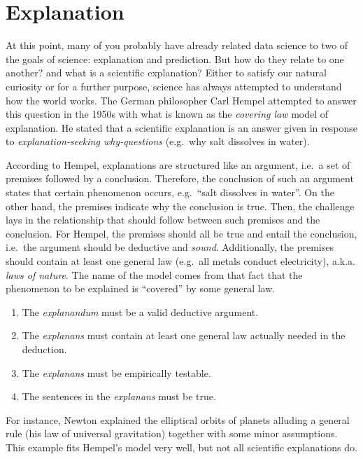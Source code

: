 \documentclass[
]{book}
\providecommand{\tightlist}{%
  \setlength{\itemsep}{0pt}\setlength{\parskip}{0pt}}
\begin{document}
\hypertarget{explanation}{%
\section{Explanation}\label{explanation}}

At this point, many of you probably have already related data science to two of the goals of science: explanation and prediction. But how do they relate to one another? and what is a scientific explanation? Either to satisfy our natural curiosity or for a further purpose, science has always attempted to understand how the world works. The German philosopher Carl Hempel attempted to answer this question in the 1950s with what is known as the \emph{covering law} model of explanation. He stated that a scientific explanation is an answer given in response to \emph{explanation-seeking why-questions} (e.g.~why salt dissolves in water).

According to Hempel, explanations are structured like an argument, i.e.~a set of premises followed by a conclusion. Therefore, the conclusion of such an argument states that certain phenomenon occurs, e.g.~``salt dissolves in water''. On the other hand, the premises indicate why the conclusion is true. Then, the challenge lays in the relationship that should follow between such premises and the conclusion. For Hempel, the premises should all be true and entail the conclusion, i.e.~the argument should be deductive and \emph{sound}. Additionally, the premises should contain at least one general law (e.g.~all metals conduct electricity), a.k.a. \emph{laws of nature}. The name of the model comes from that fact that the phenomenon to be explained is ``covered'' by some general law.

\begin{enumerate}
\def\labelenumi{\arabic{enumi}.}
\tightlist
\item
  The \emph{explanandum} must be a valid deductive argument.
\item
  The \emph{explanans} must contain at least one general law actually needed in the deduction.
\item
  The \emph{explanans} must be empirically testable.
\item
  The sentences in the \emph{explanans} must be true.
\end{enumerate}

For instance, Newton explained the elliptical orbits of planets alluding a general rule (his law of universal gravitation) together with some minor assumptions. This example fits Hempel's model very well, but not all scientific explanations do.
\end{document}
